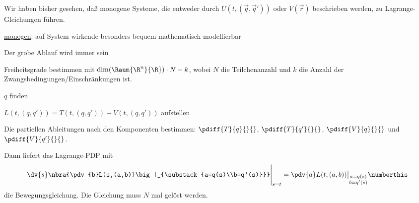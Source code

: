 \documentclass[../WiSe22ANA3.tex]{subfiles}
\begin{document}
		Wir haben bisher gesehen, daß monogene Systeme, die entweder durch $U(t,(\vec q,\vec q'))$ oder $V(\vec{r})$ beschrieben werden, zu Lagrange-Gleichungen führen. 
		\begin{center}
			\href{https://de.wikibrief.org/wiki/Monogenic_system}{monogen}: auf System wirkende besonders bequem mathematisch modellierbar
		\end{center}
		Der grobe Ablauf wird immer sein
		\begin{clist}
			\item Freiheitsgrade bestimmen mit $\dim(\Raum{\R^n}{\R})\cdot N-k$, wobei $N$ die Teilchenanzahl und $k$ die Anzahl der Zwangsbedingungen/Einschränkungen ist. 
			\item $q$ finden
			\item $L(t,(q,q'))=T(t,(q,q'))-V(t,(q,q'))$ aufstellen
			\item Die partiellen Ableitungen nach den Komponenten bestimmen: $\pdiff{T}{q}{}{}$, $\pdiff{T}{q'}{}{}$, $\pdiff{V}{q}{}{	}$ und $\pdiff{V}{q'}{}{}$.
		\end{clist}
		Dann liefert das Lagrange-PDP mit
		\begin{align*}
			\dv{s}\nbra{\pdv{b}L(s,(a,b))\big|_{\substack{a=q(s)\\b=q'(s)}}}\Bigg|_{s=t}=\pdv{a}L(t,(a,b))\big|_{\substack{a=q(s)\\b=q'(s)}}\numberthis\label{eq:LagragePDP}
		\end{align*}
		die Bewegungsgleichung. Die Gleichung muss $N$ mal gelöst werden.
\end{document}
